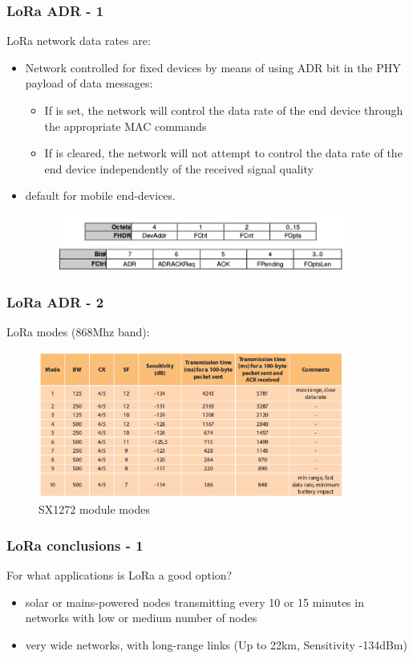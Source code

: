 \begin{frame}[fragile]
  \frametitle{LoRa ADR - 1}
  LoRa network data rates are:
 \begin{itemize}
  \item Network controlled for fixed devices by means of using ADR bit in the PHY payload of data messages:
  \begin{itemize}
    \item If is set, the network will control the data rate of the end device through the appropriate MAC commands
    \item If is cleared, the network will not attempt to control the data rate of the end device independently of the received signal quality
  \end{itemize}
  \item default for mobile end-devices.
\begin{figure}
  \centering
  \includegraphics[width=0.9\textwidth]{img/PHYpayload.png}
  \end{figure}
 \end{itemize}
\end{frame}

\begin{frame}[fragile]
  \frametitle{LoRa ADR - 2}
  LoRa modes (868Mhz band):
\begin{figure}
  \centering
  \includegraphics[width=0.9\textwidth]{img/LoRamode.png}
  \caption{SX1272 module modes}
 \end{figure}

\end{frame}

\begin{frame}[fragile]
  \frametitle{LoRa conclusions - 1}
  For what applications is LoRa a good option?
  \begin{itemize}
    \item solar or mains-powered nodes transmitting every 10 or 15 minutes in networks with low or medium number of nodes
    \item very wide networks, with long-range links (Up to 22km, Sensitivity -134dBm) 
  \end{itemize}
  
\end{frame}
  
